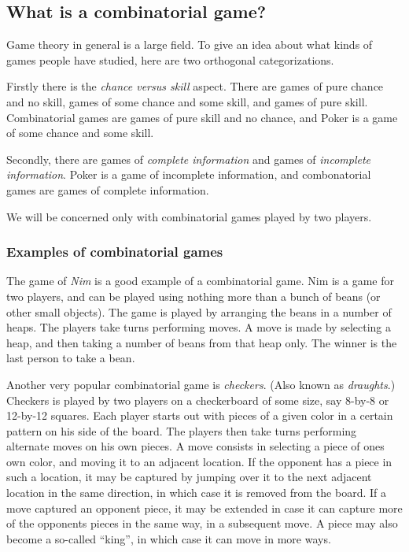 \subsection{What is a combinatorial game?}

Game theory in general is a large field.
To give an idea about what kinds of games people have studied, here are two orthogonal categorizations.

Firstly there is the \emph {chance versus skill} aspect. There are games of pure chance and no skill, games of some chance and some skill, and games of pure skill.
Combinatorial games are games of pure skill and no chance, and Poker is a game of some chance and some skill.

Secondly, there are games of \emph{complete information} and games of \emph{incomplete information}.
Poker is a game of incomplete information, and combonatorial games are games of complete information.

We will be concerned only with combinatorial games played by two players.

\subsubsection{Examples of combinatorial games}

The game of \emph{Nim} is a good example of a combinatorial game.
Nim is a game for two players, and can be played using nothing more than a bunch of beans (or other small objects).
The game is played by arranging the beans in a number of heaps.
The players take turns performing moves. A move is made by selecting a heap, and then taking a number of beans from that heap only. The winner is the last person to take a bean.

Another very popular combinatorial game is \emph{checkers}. (Also known as \emph{draughts}.)
Checkers is played by two players on a checkerboard of some size, say 8-by-8 or 12-by-12 squares.
Each player starts out with pieces of a given color in a certain pattern on his side of the board.
The players then take turns performing alternate moves on his own pieces.
A move consists in selecting a piece of ones own color, and moving it to an adjacent location.
If the opponent has a piece in such a location, it may be captured by jumping over it to the next adjacent location in the same direction, in which case it is removed from the board. If a move captured an opponent piece, it may be extended in case it can capture more of the opponents pieces in the same way, in a subsequent move. A piece may also become a so-called ``king'', in which case it can move in more ways.

